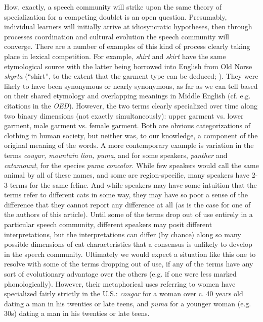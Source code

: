 How, exactly, a speech community will strike upon the same theory of specialization for a competing doublet is an open question.
Presumably, individual learners will initially arrive at idiosyncratic hypotheses, then through processes coordination  and cultural evolution \citep{kirby.cornish.smith2008} the speech community will converge. 
There are a number of examples of this kind of process clearly taking place in lexical competition.
For example, \textsl{shirt} and \textsl{skirt} have the same etymological source with the latter being borrowed into English from Old Norse \textsl{skyrta} (``shirt'', to the extent that the garment type can be deduced; \citealt{cleasbyvigfusson}).
They were likely to have been synonymous or nearly synonymous, as far as we can tell based on their shared etymology and overlapping meanings in Middle English (cf. e.g. citations in the \textsl{OED}).
However, the two terms clearly specialized over time along two binary dimensions (not exactly simultaneously): upper garment vs. lower garment, male garment vs. female garment.
Both are obvious categorizations of clothing in human society, but neither was, to our knowledge, a component of the original meaning of the words.
A more contemporary example is variation in the terms \textsl{cougar, mountain lion, puma}, and for some speakers, \textsl{panther} and \textsl{catamount}, for the species \textsl{puma concolor}.
While few speakers would call the same animal by all of these names, and some are region-specific, many speakers have 2-3 terms for the same feline.
And while speakers may have some intuition that the terms refer to different cats in some way, they may have so poor a sense of the difference that they cannot report any difference at all (as is the case for one of the authors of this article).
Until some of the terms drop out of use entirely in a particular speech community, different speakers may posit different interpretations, but the interpretations can differ (by chance) along so many possible dimensions of cat characteristics that a consensus is unlikely to develop in the speech community.
Ultimately we would expect a situation like this one to resolve with some of the terms dropping out of use, if any of the terms have any sort of evolutionary advantage over the others (e.g. if one were less marked phonologically).
However, their metaphorical uses referring to women have specialized fairly strictly in the U.S.: \textsl{cougar} for a woman over c. 40 years old dating a man in his twenties or late teens, and \textsl{puma} for a younger woman (e.g. 30s) dating a man in his twenties or late teens.

